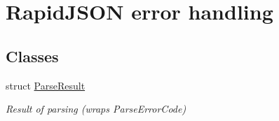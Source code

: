 \hypertarget{group__RAPIDJSON__ERRORS}{}\section{Rapid\+J\+S\+ON error handling}
\label{group__RAPIDJSON__ERRORS}
\subsection*{Classes}
\begin{DoxyCompactItemize}
\item 
struct \hyperlink{structParseResult}{Parse\+Result}
\begin{DoxyCompactList}\small\item\em Result of parsing (wraps Parse\+Error\+Code) \end{DoxyCompactList}\end{DoxyCompactItemize}

